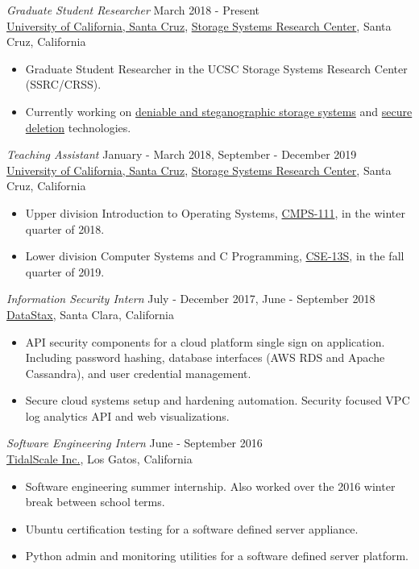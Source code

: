 \documentclass[margin, 10pt]{res} %
\begin{document}
\begin{resume}
{\sl Graduate Student Researcher} \hfill March 2018 - Present \\
\href{http://www.ucsc.edu}{University of California, Santa Cruz}, \href{https://ssrc.ucsc.edu}{Storage Systems Research Center}, Santa Cruz, California
\begin{itemize}
\item Graduate Student Researcher in the UCSC Storage Systems Research Center (SSRC/CRSS).
\item Currently working on \href{https://www.ssrc.ucsc.edu/proj/Artifice.html}{deniable and steganographic storage systems} and \href{https://www.ssrc.ucsc.edu/proj/securefs.html}{secure 
deletion} technologies. 
\end{itemize}

{\sl Teaching Assistant} \hfill January - March 2018, September - December 2019 \\
\href{http://www.ucsc.edu}{University of California, Santa Cruz}, \href{https://ssrc.ucsc.edu}{Storage Systems Research Center}, Santa Cruz, California
\begin{itemize}
\item Upper division Introduction to Operating Systems, \href{https://courses.soe.ucsc.edu/courses/cmps111/}{CMPS-111}, 
in the winter quarter of 2018.
\item Lower division Computer Systems and C Programming, \href{https://courses.soe.ucsc.edu/courses/cse13s}{CSE-13S}, in the fall quarter of 2019.
\end{itemize}

{\sl Information Security Intern} \hfill July - December 2017, June - September 2018\\
\href{http://www.datastax.com}{DataStax}, Santa Clara, California
\begin{itemize}
\item API security components for a cloud platform single sign on application. Including password hashing, database interfaces (AWS RDS and Apache Cassandra), and user credential management.
\item Secure cloud systems setup and hardening automation. Security focused VPC log analytics API and web visualizations. 
\end{itemize}

{\sl Software Engineering Intern} \hfill June - September 2016 \\
\href{https://www.tidalscale.com}{TidalScale Inc.}, Los Gatos, California
\begin{itemize}
\item Software engineering summer internship. Also worked over the 2016 winter break between school terms. 
\item Ubuntu certification testing for a software defined server appliance.
\item Python admin and monitoring utilities for a software defined server platform.
\end{itemize}


\end{resume}
\end{document}
